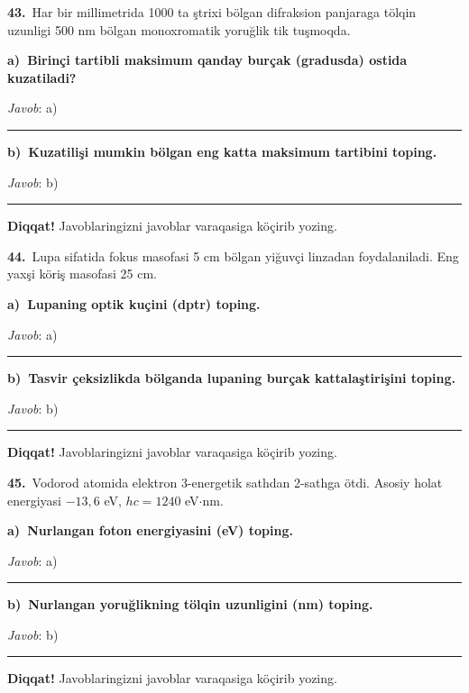 \documentclass[11pt,a4paper]{article}
\newcommand{\blank}{\rule{5cm}{0.4pt}}
\begin{document}
\noindent\textbf{43.}\ Har bir millimetrida 1000 ta ştrixi bölgan difraksion panjaraga tölqin uzunligi 500 nm bölgan monoxromatik yoruğlik tik tuşmoqda.\par\smallskip
\medskip\noindent\textbf{a)\ Birinçi tartibli maksimum qanday burçak (gradusda) ostida kuzatiladi?}\par
\noindent\textit{Javob}: a)\ \blank\par
\medskip\noindent\textbf{b)\ Kuzatilişi mumkin bölgan eng katta maksimum tartibini toping.}\par
\noindent\textit{Javob}: b)\ \blank\par
\medskip\noindent\textbf{Diqqat!} Javoblaringizni javoblar varaqasiga köçirib yozing.\par\vspace{10pt}
\noindent\textbf{44.}\ Lupa sifatida fokus masofasi 5 cm bölgan yiğuvçi linzadan foydalaniladi. Eng yaxşi köriş masofasi 25 cm.\par\smallskip
\medskip\noindent\textbf{a)\ Lupaning optik kuçini (dptr) toping.}\par
\noindent\textit{Javob}: a)\ \blank\par
\medskip\noindent\textbf{b)\ Tasvir çeksizlikda bölganda lupaning burçak kattalaştirişini toping.}\par
\noindent\textit{Javob}: b)\ \blank\par
\medskip\noindent\textbf{Diqqat!} Javoblaringizni javoblar varaqasiga köçirib yozing.\par\vspace{10pt}
\noindent\textbf{45.}\ Vodorod atomida elektron 3-energetik sathdan 2-sathga ötdi. Asosiy holat energiyasi $-13{,}6$ eV, $hc=1240$ eV$\cdot$nm.\par\smallskip
\medskip\noindent\textbf{a)\ Nurlangan foton energiyasini (eV) toping.}\par
\noindent\textit{Javob}: a)\ \blank\par
\medskip\noindent\textbf{b)\ Nurlangan yoruğlikning tölqin uzunligini (nm) toping.}\par
\noindent\textit{Javob}: b)\ \blank\par
\medskip\noindent\textbf{Diqqat!} Javoblaringizni javoblar varaqasiga köçirib yozing.\par\vspace{10pt}
\end{document}

